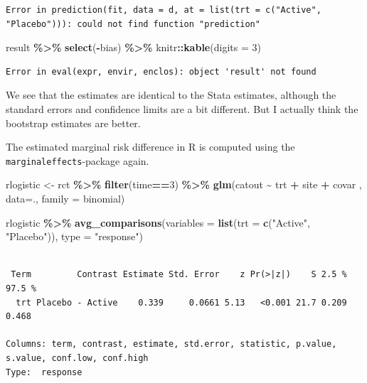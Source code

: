 \documentclass[
]{book}
\newenvironment{Shaded}{\begin{snugshade}}{\end{snugshade}}
\newcommand{\AttributeTok}[1]{\textcolor[rgb]{0.13,0.29,0.53}{#1}}
\newcommand{\DecValTok}[1]{\textcolor[rgb]{0.00,0.00,0.81}{#1}}
\newcommand{\FunctionTok}[1]{\textcolor[rgb]{0.13,0.29,0.53}{\textbf{#1}}}
\newcommand{\NormalTok}[1]{#1}
\newcommand{\OtherTok}[1]{\textcolor[rgb]{0.56,0.35,0.01}{#1}}
\newcommand{\SpecialCharTok}[1]{\textcolor[rgb]{0.81,0.36,0.00}{\textbf{#1}}}
\newcommand{\StringTok}[1]{\textcolor[rgb]{0.31,0.60,0.02}{#1}}
\begin{document}
\begin{verbatim}
Error in prediction(fit, data = d, at = list(trt = c("Active", "Placebo"))): could not find function "prediction"
\end{verbatim}

\begin{Shaded}
\begin{Highlighting}[]
\NormalTok{ result }\SpecialCharTok{\%\textgreater{}\%}
   \FunctionTok{select}\NormalTok{(}\SpecialCharTok{{-}}\NormalTok{bias) }\SpecialCharTok{\%\textgreater{}\%}
\NormalTok{   knitr}\SpecialCharTok{::}\FunctionTok{kable}\NormalTok{(}\AttributeTok{digits =} \DecValTok{3}\NormalTok{)}
\end{Highlighting}
\end{Shaded}

\begin{verbatim}
Error in eval(expr, envir, enclos): object 'result' not found
\end{verbatim}

We see that the estimates are identical to the Stata estimates, although the standard errors and confidence limits are a bit different. But I actually think the bootstrap estimates are better.

The estimated marginal risk difference in R is computed using the \texttt{marginaleffects}-package again.

\begin{Shaded}
\begin{Highlighting}[]
\NormalTok{ rlogistic }\OtherTok{\textless{}{-}}\NormalTok{ rct }\SpecialCharTok{\%\textgreater{}\%} 
  \FunctionTok{filter}\NormalTok{(time}\SpecialCharTok{==}\DecValTok{3}\NormalTok{) }\SpecialCharTok{\%\textgreater{}\%}
  \FunctionTok{glm}\NormalTok{(catout }\SpecialCharTok{\textasciitilde{}}\NormalTok{ trt }\SpecialCharTok{+}\NormalTok{ site }\SpecialCharTok{+}\NormalTok{ covar , }\AttributeTok{data=}\NormalTok{., }\AttributeTok{family =}\NormalTok{ binomial)}


\NormalTok{  rlogistic }\SpecialCharTok{\%\textgreater{}\%} 
    \FunctionTok{avg\_comparisons}\NormalTok{(}\AttributeTok{variables =} \FunctionTok{list}\NormalTok{(}\AttributeTok{trt =} \FunctionTok{c}\NormalTok{(}\StringTok{"Active"}\NormalTok{, }\StringTok{"Placebo"}\NormalTok{)), }\AttributeTok{type =} \StringTok{"response"}\NormalTok{)}
\end{Highlighting}
\end{Shaded}

\begin{verbatim}

 Term         Contrast Estimate Std. Error    z Pr(>|z|)    S 2.5 % 97.5 %
  trt Placebo - Active    0.339     0.0661 5.13   <0.001 21.7 0.209  0.468

Columns: term, contrast, estimate, std.error, statistic, p.value, s.value, conf.low, conf.high 
Type:  response 
\end{verbatim}
\end{document}
